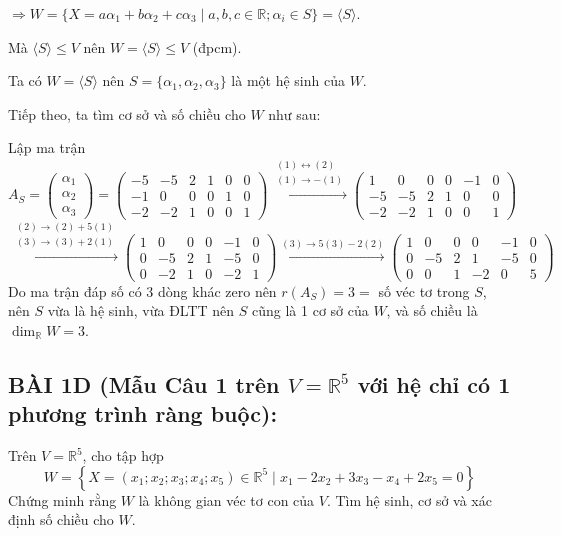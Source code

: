 \documentclass[12pt,a4paper]{article}
\newcommand{\R}{\mathbb{R}}
\begin{document}
$\Rightarrow W = \{ X = a\alpha_1 + b\alpha_2 + c\alpha_3 \mid a, b, c \in \R; \alpha_i \in S \} = \langle S \rangle$.

Mà $\langle S \rangle \le V$ nên $W = \langle S \rangle \le V$ (đpcm).

Ta có $W = \langle S \rangle$ nên $S = \{ \alpha_1, \alpha_2, \alpha_3 \}$ là một hệ sinh của $W$.

Tiếp theo, ta tìm cơ sở và số chiều cho $W$ như sau:

Lập ma trận
\[
A_S = \begin{pmatrix} \alpha_1 \\ \alpha_2 \\ \alpha_3 \end{pmatrix} = 
\begin{pmatrix} 
-5 & -5 & 2 & 1 & 0 & 0 \\ 
-1 & 0 & 0 & 0 & 1 & 0 \\ 
-2 & -2 & 1 & 0 & 0 & 1 
\end{pmatrix}
\xrightarrow{\substack{(1) \leftrightarrow (2) \\ (1) \to -(1)}}
\begin{pmatrix} 
1 & 0 & 0 & 0 & -1 & 0 \\ 
-5 & -5 & 2 & 1 & 0 & 0 \\ 
-2 & -2 & 1 & 0 & 0 & 1 
\end{pmatrix}
\]
\[
\xrightarrow{\substack{(2) \to (2) + 5(1) \\ (3) \to (3) + 2(1)}}
\begin{pmatrix} 
1 & 0 & 0 & 0 & -1 & 0 \\ 
0 & -5 & 2 & 1 & -5 & 0 \\ 
0 & -2 & 1 & 0 & -2 & 1 
\end{pmatrix}
\xrightarrow{(3) \to 5(3) - 2(2)}
\begin{pmatrix} 
1 & 0 & 0 & 0 & -1 & 0 \\ 
0 & -5 & 2 & 1 & -5 & 0 \\ 
0 & 0 & 1 & -2 & 0 & 5 
\end{pmatrix}
\]
Do ma trận đáp số có 3 dòng khác zero nên $r(A_S) = 3 = $ số véc tơ trong $S$, nên $S$ vừa là hệ sinh, vừa ĐLTT nên $S$ cũng là 1 cơ sở của $W$, và số chiều là $\dim_{\R} W = 3$.

\vspace{0.3cm}

\subsection*{BÀI 1D (Mẫu Câu 1 trên $V = \R^5$ với hệ chỉ có 1 phương trình ràng buộc):}
Trên $V=\R^5$, cho tập hợp
\[
W = \left\{ X = (x_1; x_2; x_3; x_4; x_5) \in \R^5 \mid x_1 - 2x_2 + 3x_3 - x_4 + 2x_5 = 0 \right\}
\]
Chứng minh rằng $W$ là không gian véc tơ con của $V$. Tìm hệ sinh, cơ sở và xác định số chiều cho $W$.
\end{document}
